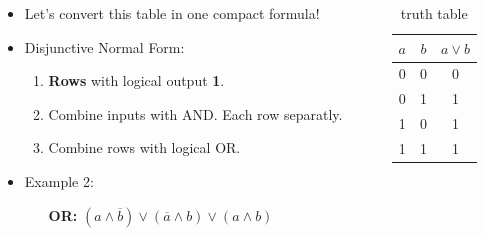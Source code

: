 \documentclass{beamer}
\begin{document}
\begin{frame}
  
  \begin{columns}
  \begin{column}{6cm}
  \begin{itemize}
    \item Let's convert this table in one compact formula!
    \item Disjunctive Normal Form:
    \begin{enumerate}
     \item \textbf{Rows} with logical output \textbf{1}.
     \item Combine inputs with AND. Each row separatly.
     \item Combine rows with logical OR.
    \end{enumerate}

    
    \item Example 2: 
    \begin{itemize}
      \item [\textbf{OR:}]$(a\land \overline{b})\lor(\overline{a}\land b)\lor(a\land b)$
    \end{itemize}
  \end{itemize}
  \end{column}
  
    
  \begin{column}{6cm}
  \begin{table}[H]
  \centering
  \begin{tabular}{c|c||c}
  \textbf{$a$} & \textbf{$b$} & \textbf{$a\lor b$} \\ \hline
  0          & 0          & 0      \\
  0          & 1          & 1  \\
  1          & 0          & 1   \\
  1          & 1          & 1 
  \end{tabular}
  \caption{truth table}
  \label{tab:truth}
  \end{table}
  \end{column}
  
  \end{columns}  
  
  
  
\end{frame}
\end{document}
